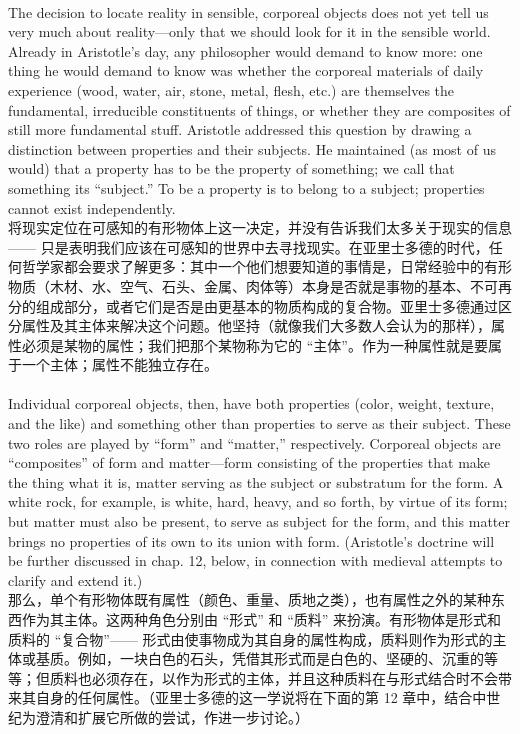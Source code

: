 \documentclass{article}
\begin{document}
\\
The decision to locate reality in sensible, corporeal objects does not yet tell us very much about reality—only that we should look for it in the sensible world. Already in Aristotle’s day, any philosopher would demand to know more: one thing he would demand to know was whether the corporeal materials of daily experience (wood, water, air, stone, metal, flesh, etc.) are themselves the fundamental, irreducible constituents of things, or whether they are composites of still more fundamental stuff. Aristotle addressed this question by drawing a distinction between properties and their subjects. He maintained (as most of us would) that a property has to be the property of something; we call that something its “subject.” To be a property is to belong to a subject; properties cannot exist independently.\\
将现实定位在可感知的有形物体上这一决定，并没有告诉我们太多关于现实的信息 —— 只是表明我们应该在可感知的世界中去寻找现实。在亚里士多德的时代，任何哲学家都会要求了解更多：其中一个他们想要知道的事情是，日常经验中的有形物质（木材、水、空气、石头、金属、肉体等）本身是否就是事物的基本、不可再分的组成部分，或者它们是否是由更基本的物质构成的复合物。亚里士多德通过区分属性及其主体来解决这个问题。他坚持（就像我们大多数人会认为的那样），属性必须是某物的属性；我们把那个某物称为它的 “主体”。作为一种属性就是要属于一个主体；属性不能独立存在。\\

\\
Individual corporeal objects, then, have both properties (color, weight, texture, and the like) and something other than properties to serve as their subject. These two roles are played by “form” and “matter,” respectively. Corporeal objects are “composites” of form and matter—form consisting of the properties that make the thing what it is, matter serving as the subject or substratum for the form. A white rock, for example, is white, hard, heavy, and so forth, by virtue of its form; but matter must also be present, to serve as subject for the form, and this matter brings no properties of its own to its union with form. (Aristotle’s doctrine will be further discussed in chap. 12, below, in connection with medieval attempts to clarify and extend it.)\\
那么，单个有形物体既有属性（颜色、重量、质地之类），也有属性之外的某种东西作为其主体。这两种角色分别由 “形式” 和 “质料” 来扮演。有形物体是形式和质料的 “复合物”—— 形式由使事物成为其自身的属性构成，质料则作为形式的主体或基质。例如，一块白色的石头，凭借其形式而是白色的、坚硬的、沉重的等等；但质料也必须存在，以作为形式的主体，并且这种质料在与形式结合时不会带来其自身的任何属性。（亚里士多德的这一学说将在下面的第 12 章中，结合中世纪为澄清和扩展它所做的尝试，作进一步讨论。）\\
\end{document}

